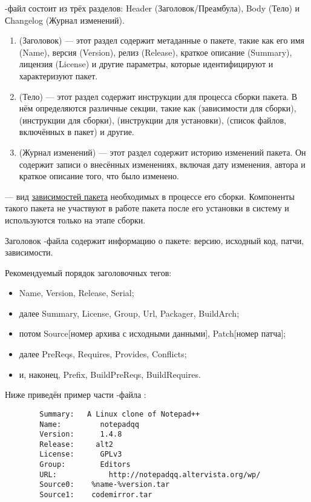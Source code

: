 -файл состоит из трёх разделов: Header (Заголовок/Преамбула), Body (Тело) и Сhangelog (Журнал изменений).
\begin{enumerate}
	\item {} (Заголовок) --- этот раздел содержит метаданные о пакете, такие как его имя (Name),
		версия (Version), релиз (Release), краткое описание (Summary), лицензия (License) и другие
		параметры, которые идентифицируют и характеризуют пакет.
	\item {} (Тело) --- этот раздел содержит инструкции для процесса сборки пакета. В нём
		определяются различные секции, такие как  (зависимости для сборки),
		 (инструкции для сборки),  (инструкции для установки),
		 (список файлов, включённых в пакет) и другие.
	\item {} (Журнал изменений) --- этот раздел содержит историю изменений пакета.
		Он содержит записи о внесённых изменениях, включая дату изменения, автора и краткое
		описание того, что было изменено.
\end{enumerate}

 --- вид \hyperlink{require-def}{зависимостей пакета}
необходимых в процессе его сборки. Компоненты такого пакета не участвуют в работе пакета после его установки в
систему и используются только на этапе сборки.


Заголовок -файла содержит информацию о пакете: версию, исходный код, патчи, зависимости.

Рекомендуемый порядок заголовочных тегов:
\begin{itemize}
	\item Name, Version, Release, Serial;
	\item далее Summary, License, Group, Url, Packager, BuildArch;
	\item потом Source[номер архива с исходными данными], Patch[номер патча];
	\item далее PreReqs, Requires, Provides, Conflicts;
	\item и, наконец, Prefix, BuildPreReqs, BuildRequires.
\end{itemize}

Ниже приведён пример части -файла :
\begin{verbatim}
        Summary:   A Linux clone of Notepad++
        Name:         notepadqq
        Version:      1.4.8
        Release:     alt2
        License:      GPLv3
        Group:        Editors
        URL:            http://notepadqq.altervista.org/wp/
        Source0:    %name-%version.tar
        Source1:    codemirror.tar
\end{verbatim}

